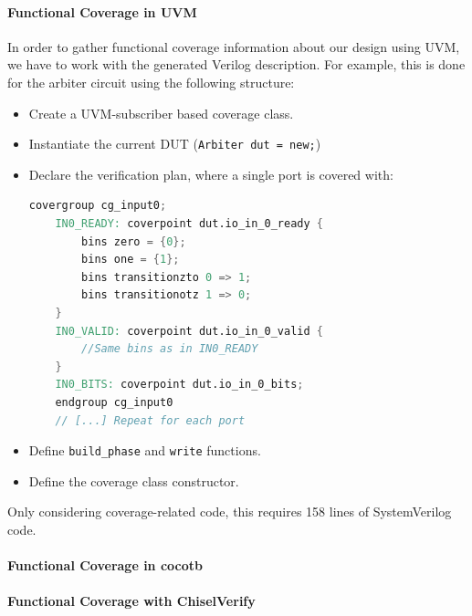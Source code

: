 \documentclass[conference]{IEEEtran}
\begin{document}
\paragraph{Functional Coverage in UVM} In order to gather functional coverage information about our design using UVM, we have to work with the generated Verilog description.
For example, this is done for the arbiter circuit using the following structure:
\begin{itemize}
    \item Create a UVM-subscriber based coverage class.
    \item Instantiate the current DUT (\texttt{Arbiter dut = new;})
    \item Declare the verification plan, where a single port is covered with: 
    \begin{lstlisting}[language=verilog]
	covergroup cg_input0;
	IN0_READY: coverpoint dut.io_in_0_ready {
		bins zero = {0};
		bins one = {1};
		bins transitionzto 0 => 1;
		bins transitionotz 1 => 0;
	}
	IN0_VALID: coverpoint dut.io_in_0_valid {
		//Same bins as in IN0_READY
	}
	IN0_BITS: coverpoint dut.io_in_0_bits;
	endgroup cg_input0
	// [...] Repeat for each port
    \end{lstlisting}
    \item Define \texttt{build\_phase} and \texttt{write} functions.
    \item Define the coverage class constructor.
\end{itemize}  
Only considering coverage-related code, this requires 158 lines of SystemVerilog code. 

\paragraph{Functional Coverage in cocotb} %
\paragraph{Functional Coverage with ChiselVerify} %
\end{document}
